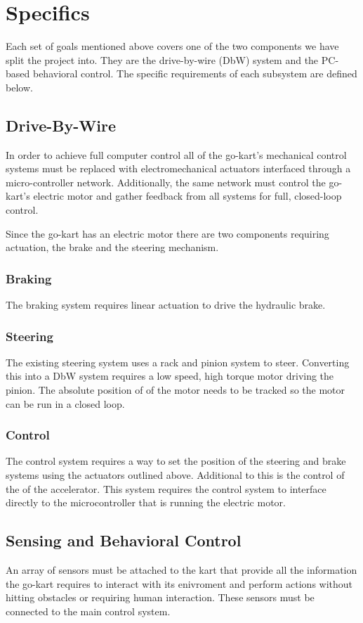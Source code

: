 \section{Specifics}
Each set of goals mentioned above covers one of the two components we have split the project into. They are the drive-by-wire (DbW) system and the PC-based behavioral control. The specific requirements of each subsystem are defined below.

\subsection{Drive-By-Wire}
In order to achieve full computer control all of the go-kart's mechanical control systems must be replaced with electromechanical actuators interfaced through a micro-controller network. Additionally, the same network must control the go-kart's electric motor and gather feedback from all systems for full, closed-loop control.

Since the go-kart has an electric motor there are two components requiring actuation, the brake and the steering mechanism.

\subsubsection{Braking}
The braking system requires linear actuation to drive the hydraulic  brake. 

\subsubsection{Steering}
The existing steering system uses a rack and pinion system to steer. Converting this into a DbW system requires a low speed, high torque motor driving the pinion. The absolute position of of the motor needs to be tracked so the motor can be run in a closed loop.

\subsubsection{Control}
The control system requires a way to set the position of the steering and brake systems using the actuators outlined above. Additional to this is the control of the of the accelerator. This system requires the control system to interface directly to the microcontroller that is running the electric motor.

\subsection{Sensing and Behavioral Control}
An array of sensors must be attached to the kart that provide all the information the go-kart requires to interact with its enivroment and perform actions without hitting obstacles or requiring human interaction. These sensors must be connected to the main control system. 

